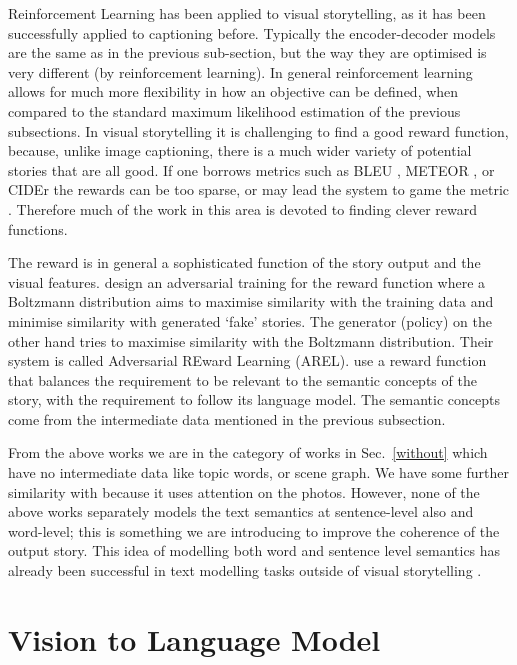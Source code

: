 \documentclass[a4paper,fleqn]{cas-sc}
\begin{document}
Reinforcement Learning has been applied to visual storytelling, as it has been successfully applied to captioning before. Typically the encoder-decoder models are the same as in the previous sub-section, but the way they are optimised is very different (by reinforcement learning). In general reinforcement learning allows for much more flexibility in how an objective can be defined, when compared to the standard maximum likelihood estimation of the previous subsections.
In visual storytelling it is challenging to find a good reward function, because, unlike image captioning, there is a much wider variety of potential stories that are all good. If one borrows metrics such as BLEU \citep{BLEU2002}, METEOR \citep{meteor}, or CIDEr \citep{CIDEr2014} the rewards can be too sparse, or may lead the system to game the metric
\citep{wang-etal-2018-metrics}. Therefore much of the work in this area is devoted to finding clever reward functions.

The reward is in general a sophisticated function of the story output and the visual features.
\citet{wang-etal-2018-metrics} design an adversarial training for the reward function where a Boltzmann distribution aims to maximise similarity with the training data and minimise similarity with generated `fake' stories.
The generator (policy) on the other hand tries to maximise similarity with the Boltzmann distribution. Their system is called  Adversarial
REward Learning (AREL).
\citet{Huang2019} use a reward function that balances the requirement to be relevant to the semantic concepts of the story, with the requirement to follow its language model. The semantic concepts come from the intermediate data mentioned in the previous subsection. 

From the above works we are in the category of works in Sec.~\ref{without} which have no intermediate data like topic words, or scene graph. We  have some further similarity with \citet{wang2019} because it uses attention on the photos.
However, none of the above works separately models the text semantics at sentence-level also and word-level; this is something we are introducing to improve the coherence of the output story. This idea of modelling both word and sentence level semantics has already been successful in text modelling tasks outside of visual storytelling \citep{li-etal-2015-hierarchical,Serban,zhang2018sentencestate}.

\section{Vision to Language Model}
\end{document}
